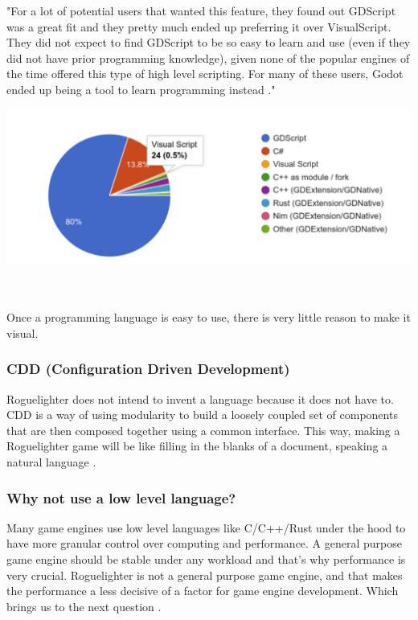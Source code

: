 \documentclass{article}
\begin{document}
"For a lot of potential users that wanted this feature, they found out GDScript was a great fit and they pretty much ended up preferring it over VisualScript. They did not expect to find GDScript to be so easy to learn and use (even if they did not have prior programming knowledge), given none of the popular engines of the time offered this type of high level scripting. For many of these users, Godot ended up being a tool to learn programming instead \cite{godot-visual}."

\begin{minipage}{\linewidth}
    \centering
    \includegraphics[width=1\textwidth]{godot-statistics.png}
\end{minipage}\\\\

Once a programming language is easy to use, there is very little reason to make it visual.

\subsubsection{CDD (Configuration Driven Development)}
Roguelighter does not intend to invent a language because it does not have to. CDD is a way of using modularity to build a loosely coupled set of components that are then composed together using a common interface. This way, making a Roguelighter game will be like filling in the blanks of a document, speaking a natural language \cite{cdd}.

\subsubsection{Why not use a low level language?}
Many game engines use low level languages like C/C++/Rust under the hood to have more granular control over computing and performance. A general purpose game engine should be stable under any workload and that's why performance is very crucial. Roguelighter is not a general purpose game engine, and that makes the performance a less decisive of a factor for game engine development. Which brings us to the next question \cite{low-level}\cite{low-level-1}\cite{low-level-2}.
\end{document}
